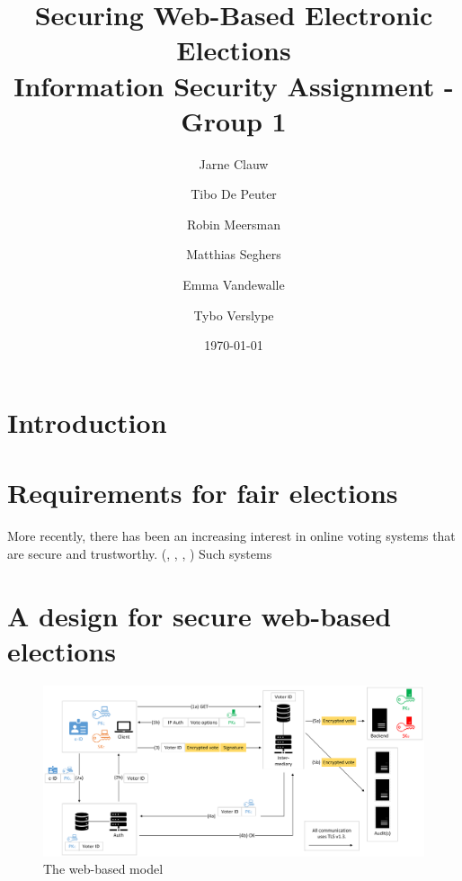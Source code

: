 \documentclass[a4paper,12pt,english]{article}
\title{Securing Web-Based Electronic Elections
\\
\large Information Security Assignment - Group 1}
\author{Jarne Clauw
    \and
    Tibo De Peuter
    \and
    Robin Meersman
    \and
    Matthias Seghers
    \and
    Emma Vandewalle
    \and
    Tybo Verslype
}
\date{\today}
\begin{document}
\maketitle

\section{Introduction}\label{sec:introduction}

\section{Requirements for fair elections}\label{sec:requirements}

\cite{european-liberties-platform-2021}

\cite{cryptoeprint:2016/287}

More recently, there has been an increasing interest in online voting systems that are secure and trustworthy. (\cite{10.1145/2660267.2660315}, \cite{10.1007/978-3-030-51280-4_3}, \cite{263858}, \cite{halderman2015new}) Such systems 

\section{A design for secure web-based elections}\label{sec:design}

\begin{figure}
    \centering
    \includegraphics[width=\textwidth]{Schematic}
    \caption{The web-based model}\label{fig:schematic}
\end{figure}
\end{document}
